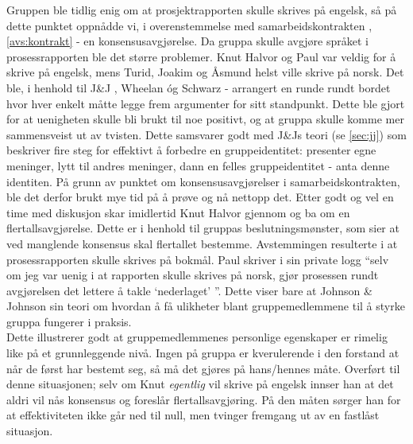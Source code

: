 Gruppen ble tidlig enig om at prosjektrapporten skulle skrives på engelsk, så på
dette punktet oppnådde vi, i overenstemmelse med samarbeidskontrakten ,
\cref{avs:kontrakt} - en konsensusavgjørelse. Da gruppa skulle avgjøre språket i
prosessrapporten ble det større problemer. Knut Halvor og Paul var veldig for å
skrive på engelsk, mens Turid, Joakim og Åsmund helst ville skrive på norsk. Det
ble, i henhold til J\&J \cite{jj}, Wheelan \cite{wheelan} óg Schwarz
\cite{schwarz} - arrangert en runde rundt bordet hvor hver enkelt måtte legge
frem argumenter for sitt standpunkt. Dette ble gjort for at uenigheten skulle
bli brukt til noe positivt, og at gruppa skulle komme mer sammensveist ut av
tvisten. Dette samsvarer godt med J\&Js teori (se \cref{sec:jj}) som beskriver
fire steg for effektivt å forbedre en gruppeidentitet: presenter egne meninger,
lytt til andres meninger, dann en felles gruppeidentitet - anta denne identiten.
På grunn av punktet om konsensusavgjørelser i samarbeidskontrakten, ble det
derfor brukt mye tid på å prøve og nå nettopp det. Etter godt og vel en time med
diskusjon skar imidlertid Knut Halvor gjennom og ba om en
flertallsavgjørelse. Dette er i henhold til gruppas beslutningsmønster, som sier
at ved manglende konsensus skal flertallet bestemme. Avstemmingen resulterte i
at prosessrapporten skulle skrives på bokmål. Paul skriver i sin private logg ``selv om jeg var uenig i at rapporten skulle
skrives på norsk, gjør prosessen rundt avgjørelsen det lettere å takle
`nederlaget' ''. Dette viser bare at Johnson \& Johnson sin teori \cite{jj} om
hvordan å få ulikheter blant gruppemedlemmene til å styrke gruppa fungerer i
praksis.\\ 

Dette illustrerer godt at gruppemedlemmenes personlige egenskaper er rimelig
like på et grunnleggende nivå. Ingen på gruppa er kverulerende i den forstand at
når de først har bestemt seg, så må det gjøres på hans/hennes måte. Overført til
denne situasjonen; selv om Knut \emph{egentlig} vil skrive på
engelsk innser han at det aldri vil nås konsensus og foreslår
flertallsavgjøring. På den måten sørger han for at effektiviteten ikke går ned
til null, men tvinger fremgang ut av en fastlåst situasjon. \\

